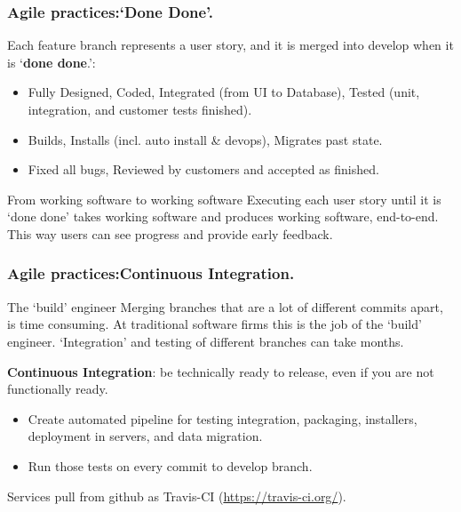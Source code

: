 \documentclass{beamer} %
\newcommand\emc[1]{\textcolor{brightblue}{\textbf{#1}}}
\begin{document}
\begin{frame}
\frametitle{Agile practices:`Done Done'.}

Each feature branch represents a user story, and it is merged into develop when it is `\emc{done done}.':
\begin{itemize}
  \item Fully Designed, Coded, Integrated (from UI to Database), Tested (unit, integration, and customer tests finished).
  \item Builds, Installs (incl. auto install \& devops), Migrates past state.
  \item Fixed all bugs, Reviewed by customers and accepted as finished.
\end{itemize}

\begin{block}{From working software to working software}
Executing each user story until it is `done done' takes working software and produces working software, end-to-end. This way users can see progress and provide early feedback.
\end{block}

\end{frame}

\begin{frame}
\frametitle{Agile practices:Continuous Integration.}

\begin{block}{The `build' engineer}
Merging branches that are a lot of different commits apart, is time consuming. At traditional software firms this is the job of the `build' engineer. `Integration' and testing of different branches can take months.
\end{block}

\vspace{3mm}
\emc{Continuous Integration}: be technically ready to release, even if you are not functionally ready.
\begin{itemize}
  \item Create automated pipeline for testing integration, packaging, installers, deployment in servers, and data migration.
  \item Run those tests on every commit to develop branch.
  \end{itemize}

\vspace{5mm}
Services pull from github as Travis-CI (\url{https://travis-ci.org/}).

\end{frame}
\end{document}

